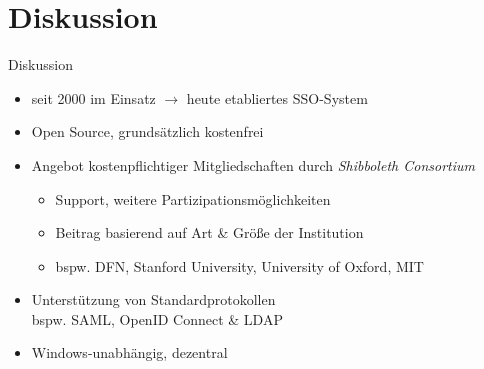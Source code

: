 
\section{Diskussion}

\begin{frame}{Diskussion}
    \begin{itemize}
        \item seit 2000 im Einsatz $\to$ heute etabliertes SSO-System~\cite{shibbolethShibbolethConsortium2024}
        
        \pause

        \item Open Source, grundsätzlich kostenfrei~\cite{shibbolethMembership}
        \item Angebot kostenpflichtiger Mitgliedschaften durch \emph{Shibboleth Consortium}~\cite{shibbolethMembership, shibbolethShibbolethConsortium2024}
        \begin{itemize}
            \item Support, weitere Partizipationsmöglichkeiten
            \item Beitrag basierend auf Art \& Größe der Institution~\cite{shibbolethMembership, shibbolethShibbolethConsortium2024}
            \item bspw. DFN, Stanford University, University of Oxford, MIT~\cite{shibbolethOurMembers2024}
        \end{itemize}

        \pause

        \item Unterstützung von Standardprotokollen\\
            bspw. SAML, OpenID Connect \& LDAP~\cite{cantorConsortiumFAQShibboleth2023, overtsoftwareAzureADADFS2022}
        \item Windows-unabhängig, dezentral~\cite{overtsoftwareAzureADADFS2022}
    \end{itemize}
\end{frame}


